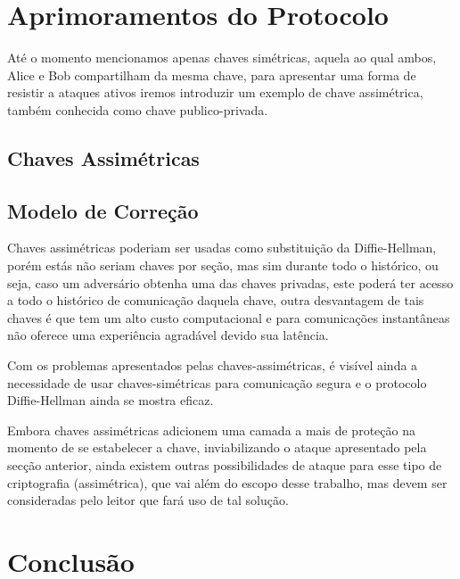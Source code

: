 \documentclass{article}
\begin{document}
\section{Aprimoramentos do Protocolo}
\label{sec:aprimoramentos_protocolo}
Até o momento mencionamos apenas chaves simétricas, aquela ao qual ambos, Alice e Bob compartilham da mesma chave, para apresentar uma forma de resistir a ataques ativos iremos introduzir um exemplo de chave assimétrica, também conhecida como chave publico-privada.

\subsection{Chaves Assimétricas}
\label{sub:chaves_assimetricas}

\subsection{Modelo de Correção}
\label{sub:modelo_correcao}
Chaves assimétricas poderiam ser usadas como substituição da Diffie-Hellman, porém estás não seriam chaves por seção, mas sim durante todo o histórico, ou seja, caso um
adversário obtenha uma das chaves privadas, este poderá ter acesso a todo o histórico
de comunicação daquela chave, outra desvantagem de tais chaves é que tem um alto custo computacional e para comunicações instantâneas não oferece uma experiência agradável devido sua latência.

Com os problemas apresentados pelas chaves-assimétricas, é visível ainda a necessidade
de usar chaves-simétricas para comunicação segura e o protocolo Diffie-Hellman ainda
se mostra eficaz.


Embora chaves assimétricas adicionem uma camada a mais de proteção na momento de
se estabelecer a chave, inviabilizando o ataque apresentado pela secção anterior,
ainda existem outras possibilidades de ataque para esse tipo de criptografia
(assimétrica), que vai além do escopo desse trabalho, mas devem ser consideradas
pelo leitor que fará uso de tal solução.

\section{Conclusão}%
\label{sec:conclusao}
\end{document}
